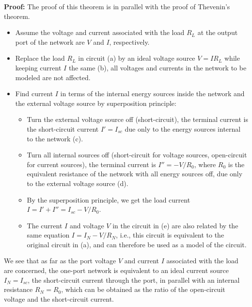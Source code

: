 \documentclass{article}
\begin{document}
\begin{itemize}
  {\bf Proof:} The proof of this theorem is in parallel with the proof of 
  Thevenin's theorem. 


  \begin{itemize}
  \item Assume the voltage and current associated with the load $R_L$ at
    the output port of the network are $V$ and $I$, respectively. 

  \item Replace the load $R_L$ in circuit (a) by an ideal voltage source 
    $V=IR_L$ while keeping current $I$ the same (b), all voltages and currents 
    in the network to be modeled are not affected. 
	
  \item Find current $I$ in terms of the internal energy sources inside
    the network and the external voltage source by superposition principle:

    \begin{itemize}
    \item Turn the external voltage source off (short-circuit), the terminal
      current is the short-circuit current $I'=I_{sc}$ due only to the energy
      sources internal to the network (c).
    \item Turn all internal sources off (short-circuit for voltage sources, 
      open-circuit for current sources), the terminal current is $I''=-V/R_0$,
      where $R_0$ is the equivalent resistance of the network with all energy
      sources off, due only to the external voltage source (d).
    \item By the superposition principle, we get the load current  
      $I=I'+I''=I_{sc}-V/R_0$. 
    \item The current $I$ and voltage $V$ in the circuit in (e) are also 
      related by the same equation $I=I_N-V/R_N$, i.e., this circuit
      is equivalent to the original circuit in (a), and can therefore be 
      used as a model of the circuit.
    \end{itemize}

  \end{itemize}

  We see that as far as the port voltage $V$ and current $I$ associated 
  with the load are concerned, the one-port network is equivalent to an 
  ideal current source $I_N=I_{sc}$, the short-circuit current through the 
  port, in parallel with an internal resistance $R_N=R_0$, which can be 
  obtained as the ratio of the open-circuit voltage and the short-circuit 
  current.


\end{itemize}
\end{document}

